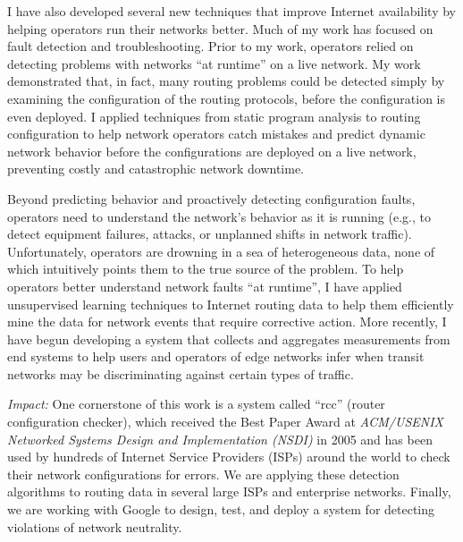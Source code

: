 I have also developed several new techniques that improve Internet
availability by helping operators run their networks better.  Much of my
work has focused on fault detection and troubleshooting.  Prior to my
work, operators relied on detecting problems with networks ``at
runtime'' on a live network.  My work demonstrated that, in fact, many
routing problems could be detected simply by examining the configuration
of the routing protocols, before the configuration is even deployed.  I
applied techniques from static program analysis to routing configuration
to help network operators catch mistakes and predict dynamic network
behavior before the configurations are deployed on a live network,
preventing costly and catastrophic network downtime.

Beyond predicting behavior and proactively detecting configuration
faults, operators need to understand the network's behavior as it is
running (e.g., to detect equipment failures, attacks, or unplanned
shifts in network traffic).  Unfortunately, operators are drowning in a
sea of heterogeneous data, none of which intuitively points them to the
true source of the problem.  To help operators better understand network
faults ``at runtime'', I have applied unsupervised learning techniques
to Internet routing data to help them efficiently mine the data for
network events that require corrective action.  More recently, I have
begun developing a system that collects and aggregates measurements from
end systems to help users and operators of edge networks infer when
transit networks may be discriminating against certain types of traffic.


{\em Impact:} One cornerstone of this work is a system called ``rcc''
(router configuration checker), which received the Best Paper Award at
{\em ACM/USENIX Networked Systems Design and Implementation (NSDI)} in
2005 and has been used by hundreds of Internet Service Providers (ISPs)
around the world to check their network configurations for errors.  We
are applying these detection algorithms to routing data in several large
ISPs and enterprise networks.  Finally, we are working with Google to
design, test, and deploy a system for detecting violations of network
neutrality.




